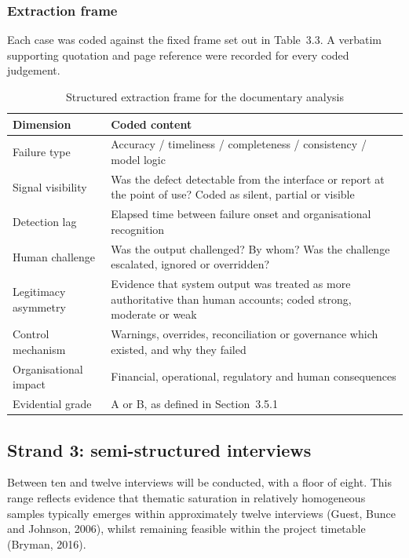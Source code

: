 \documentclass[11pt,a4paper]{article}
\numberwithin{figure}{section}
\numberwithin{table}{section}
\newcommand{\ct}[1]{\textcolor{citeblue}{#1}}          %
\newcommand{\xref}[1]{\textcolor{citeblue}{#1}}         %
\begin{document}
\subsubsection{Extraction frame}

Each case was coded against the fixed frame set out in \xref{Table~3.3}. A verbatim supporting
quotation and page reference were recorded for every coded judgement.

\begin{table}[H]
\centering\small
\caption{Structured extraction frame for the documentary analysis}
\label{tab:frame}
\begin{tabularx}{\textwidth}{@{}p{3.4cm} X@{}}
\toprule
\textbf{Dimension} & \textbf{Coded content} \\
\midrule
Failure type & Accuracy / timeliness / completeness / consistency / model logic \\
Signal visibility & Was the defect detectable from the interface or report at the point of use?
Coded as silent, partial or visible \\
Detection lag & Elapsed time between failure onset and organisational recognition \\
Human challenge & Was the output challenged? By whom? Was the challenge escalated, ignored or
overridden? \\
Legitimacy asymmetry & Evidence that system output was treated as more authoritative than human
accounts; coded strong, moderate or weak \\
Control mechanism & Warnings, overrides, reconciliation or governance which existed, and why they
failed \\
Organisational impact & Financial, operational, regulatory and human consequences \\
Evidential grade & A or B, as defined in Section~3.5.1 \\
\bottomrule
\end{tabularx}
\end{table}

\subsection{Strand 3: semi-structured interviews}

Between ten and twelve interviews will be conducted, with a floor of eight. This range reflects
evidence that thematic saturation in relatively homogeneous samples typically emerges within
approximately twelve interviews \ct{(Guest, Bunce and Johnson, 2006)}, whilst remaining feasible
within the project timetable \ct{(Bryman, 2016)}.
\end{document}

